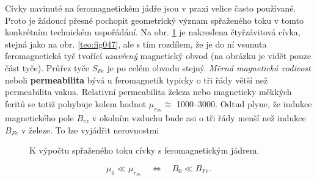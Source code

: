       Cívky navinuté na feromagnetickém jádře jsou v praxi velice často používané. Proto je žádoucí
      přesné pochopit geometrický význam spřaženého toku v tomto konkrétním technickém uspořádání.
      Na obr. \ref{teo:fig049} je nakreslena čtyřzávitová cívka, stejná jako na obr.
      \ref{teo:fig047}, ale s tím rozdílem, že je do ní vsunuta feromagnetická tyč tvořící
      \emph{uzavřený} magnetický obvod (na obrázku je vidět pouze část tyče). Průřez tyče \(S_{Fe}\)
      je po celém obvodu stejný. \emph{Měrná magnetická vodivost} neboli \textbf{permeabilita} bývá
      u feromagnetik typicky o tři řády větší než permeabilita vakua. Relativní permeabilita železa
      nebo magneticky měkkých feritů se totiž pohybuje kolem hodnot \(\mu_{r_{Fe}}\cong\)
      \numrange{1000}{3000}. Odtud plyne, že indukce magnetického pole \(B_{vz}\) v okolním vzduchu
      bude asi o tři řády menší než indukce \(B_{Fe}\) v železe. To lze vyjádřit nerovnostmi

      \begin{figure}[ht!]
        \centering  
        \caption{K výpočtu spřaženého toku cívky s feromagnetickým jádrem. \cite[s.~17]{Patocka4}} 
        \label{teo:fig049}
      \end{figure}

      \begin{equation}\label{TEO:eq087}
        \mu_0\ll\mu_{r_{Fe}}\quad\Longleftrightarrow\quad B_0\ll B_{Fe}. 
      \end{equation}
      
